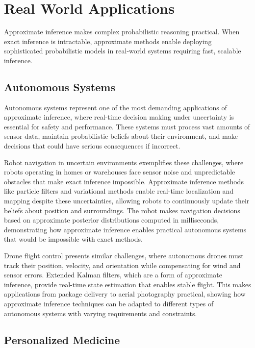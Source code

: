 
\section{Real World Applications}
\label{sec:approx-inference-real-world}


Approximate inference makes complex probabilistic reasoning practical. When exact inference is intractable, approximate methods enable deploying sophisticated probabilistic models in real-world systems requiring fast, scalable inference.

\subsection{Autonomous Systems}

Autonomous systems represent one of the most demanding applications of approximate inference, where real-time decision making under uncertainty is essential for safety and performance. These systems must process vast amounts of sensor data, maintain probabilistic beliefs about their environment, and make decisions that could have serious consequences if incorrect.

Robot navigation in uncertain environments exemplifies these challenges, where robots operating in homes or warehouses face sensor noise and unpredictable obstacles that make exact inference impossible. Approximate inference methods like particle filters and variational methods enable real-time localization and mapping despite these uncertainties, allowing robots to continuously update their beliefs about position and surroundings. The robot makes navigation decisions based on approximate posterior distributions computed in milliseconds, demonstrating how approximate inference enables practical autonomous systems that would be impossible with exact methods.

Drone flight control presents similar challenges, where autonomous drones must track their position, velocity, and orientation while compensating for wind and sensor errors. Extended Kalman filters, which are a form of approximate inference, provide real-time state estimation that enables stable flight. This makes applications from package delivery to aerial photography practical, showing how approximate inference techniques can be adapted to different types of autonomous systems with varying requirements and constraints.

\subsection{Personalized Medicine}

